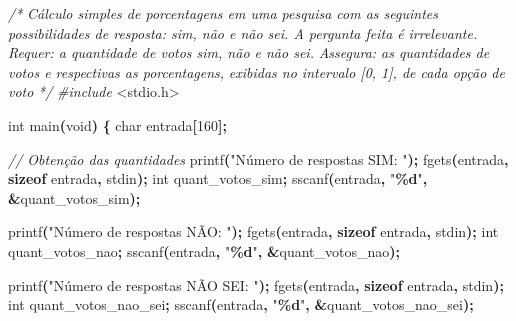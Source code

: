 \documentclass[
  11pt,
  a4paper,
]{scrbook}
\newenvironment{Shaded}{\begin{snugshade}}{\end{snugshade}}
\newcommand{\CommentTok}[1]{\textcolor[rgb]{0.56,0.35,0.01}{\textit{#1}}}
\newcommand{\DataTypeTok}[1]{\textcolor[rgb]{0.13,0.29,0.53}{#1}}
\newcommand{\DecValTok}[1]{\textcolor[rgb]{0.00,0.00,0.81}{#1}}
\newcommand{\ImportTok}[1]{#1}
\newcommand{\KeywordTok}[1]{\textcolor[rgb]{0.13,0.29,0.53}{\textbf{#1}}}
\newcommand{\NormalTok}[1]{#1}
\newcommand{\OperatorTok}[1]{\textcolor[rgb]{0.81,0.36,0.00}{\textbf{#1}}}
\newcommand{\PreprocessorTok}[1]{\textcolor[rgb]{0.56,0.35,0.01}{\textit{#1}}}
\newcommand{\SpecialCharTok}[1]{\textcolor[rgb]{0.81,0.36,0.00}{\textbf{#1}}}
\newcommand{\StringTok}[1]{\textcolor[rgb]{0.31,0.60,0.02}{#1}}
\begin{document}
\begin{Shaded}
\begin{Highlighting}[]
\CommentTok{/*}
\CommentTok{Cálculo simples de porcentagens em uma pesquisa com as seguintes }
\CommentTok{    possibilidades de resposta: sim, não e não sei. A pergunta feita é}
\CommentTok{    irrelevante.}
\CommentTok{Requer: a quantidade de votos sim, não e não sei.}
\CommentTok{Assegura: as quantidades de votos e respectivas as porcentagens,}
\CommentTok{    exibidas no intervalo [0, 1], de cada opção de voto}
\CommentTok{*/}
\PreprocessorTok{\#include }\ImportTok{\textless{}stdio.h\textgreater{}}

\DataTypeTok{int}\NormalTok{ main}\OperatorTok{(}\DataTypeTok{void}\OperatorTok{)} \OperatorTok{\{}
    \DataTypeTok{char}\NormalTok{ entrada}\OperatorTok{[}\DecValTok{160}\OperatorTok{];}

    \CommentTok{// Obtenção das quantidades}
\NormalTok{    printf}\OperatorTok{(}\StringTok{"Número de respostas SIM: "}\OperatorTok{);}
\NormalTok{    fgets}\OperatorTok{(}\NormalTok{entrada}\OperatorTok{,} \KeywordTok{sizeof}\NormalTok{ entrada}\OperatorTok{,}\NormalTok{ stdin}\OperatorTok{);}
    \DataTypeTok{int}\NormalTok{ quant\_votos\_sim}\OperatorTok{;}
\NormalTok{    sscanf}\OperatorTok{(}\NormalTok{entrada}\OperatorTok{,} \StringTok{"}\SpecialCharTok{\%d}\StringTok{"}\OperatorTok{,} \OperatorTok{\&}\NormalTok{quant\_votos\_sim}\OperatorTok{);}

\NormalTok{    printf}\OperatorTok{(}\StringTok{"Número de respostas NÃO: "}\OperatorTok{);}
\NormalTok{    fgets}\OperatorTok{(}\NormalTok{entrada}\OperatorTok{,} \KeywordTok{sizeof}\NormalTok{ entrada}\OperatorTok{,}\NormalTok{ stdin}\OperatorTok{);}
    \DataTypeTok{int}\NormalTok{ quant\_votos\_nao}\OperatorTok{;}
\NormalTok{    sscanf}\OperatorTok{(}\NormalTok{entrada}\OperatorTok{,} \StringTok{"}\SpecialCharTok{\%d}\StringTok{"}\OperatorTok{,} \OperatorTok{\&}\NormalTok{quant\_votos\_nao}\OperatorTok{);}

\NormalTok{    printf}\OperatorTok{(}\StringTok{"Número de respostas NÃO SEI: "}\OperatorTok{);}
\NormalTok{    fgets}\OperatorTok{(}\NormalTok{entrada}\OperatorTok{,} \KeywordTok{sizeof}\NormalTok{ entrada}\OperatorTok{,}\NormalTok{ stdin}\OperatorTok{);}
    \DataTypeTok{int}\NormalTok{ quant\_votos\_nao\_sei}\OperatorTok{;}
\NormalTok{    sscanf}\OperatorTok{(}\NormalTok{entrada}\OperatorTok{,} \StringTok{"}\SpecialCharTok{\%d}\StringTok{"}\OperatorTok{,} \OperatorTok{\&}\NormalTok{quant\_votos\_nao\_sei}\OperatorTok{);}


\end{Highlighting}
\end{Shaded}
\end{document}
